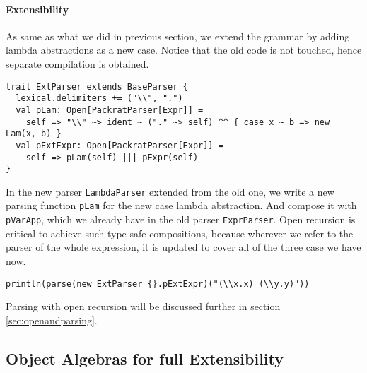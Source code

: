 


\paragraph{Extensibility} As same as what we did in previous section, we extend the grammar by adding lambda abstractions as a new case. Notice that the old code is not touched, hence separate compilation is obtained.

\begin{lstlisting}
trait ExtParser extends BaseParser {
  lexical.delimiters += ("\\", ".")
  val pLam: Open[PackratParser[Expr]] =
    self => "\\" ~> ident ~ ("." ~> self) ^^ { case x ~ b => new Lam(x, b) }
  val pExtExpr: Open[PackratParser[Expr]] =
    self => pLam(self) ||| pExpr(self)
}
\end{lstlisting}

In the new parser \lstinline{LambdaParser} extended from the old one,
we write a new parsing function \lstinline{pLam} for the new case
lambda abstraction. And compose it with \lstinline{pVarApp}, which we
already have in the old parser \lstinline{ExprParser}. Open recursion
is critical to achieve such type-safe compositions, because wherever
we refer to the parser of the whole expression, it is updated to cover
all of the three case we have now.

\begin{lstlisting}
println(parse(new ExtParser {}.pExtExpr)("(\\x.x) (\\y.y)"))
\end{lstlisting}

Parsing with open recursion will be discussed further in section \ref{sec:openandparsing}.

\subsection{Object Algebras for full Extensibility}\label{subsec:overview-oa}

